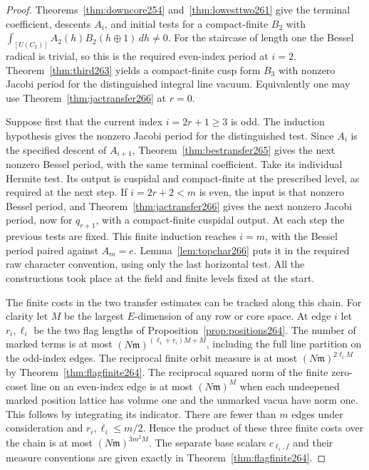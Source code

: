\documentclass[a4paper,11pt]{article}
\theoremstyle{definition}
\theoremstyle{remark}
\numberwithin{equation}{section}
\begin{document}
\begin{proof}
Theorems~\ref{thm:downcore254} and~\ref{thm:lowesttwo261}
give the terminal coefficient, descents \(A_i\), and initial
tests for a compact-finite \(B_2\) with
\(\int_{[U(C_2)]} A_2(h) B_2(h\oplus1)\,dh\ne0\).
For the staircase of length one the Bessel radical is
trivial, so this is the required even-index period at \(i=2\).
Theorem~\ref{thm:third263} yields a compact-finite cusp form
\(B_3\) with nonzero Jacobi period for the distinguished
integral line vacuum. Equivalently one may use
Theorem~\ref{thm:jactransfer266} at \(r=0\).

Suppose first that the current index \(i=2r+1\ge3\) is odd.
The induction hypothesis gives the nonzero Jacobi period for
the distinguished test. Since \(A_i\) is the specified
descent of \(A_{i+1}\), Theorem~\ref{thm:bestransfer265}
gives the next nonzero Bessel period, with the same terminal
coefficient. Take its individual Hermite test. Its output is
cuspidal and compact-finite at the prescribed level, as
required at the next step. If \(i=2r+2<m\) is even, the
input is that nonzero Bessel period, and
Theorem~\ref{thm:jactransfer266} gives the next nonzero Jacobi
period, now for \(q_{r+1}\), with a compact-finite cuspidal
output. At each step the previous tests are fixed. This
finite induction reaches \(i=m\), with the Bessel period
paired against \(A_m=e\). Lemma~\ref{lem:topchar266} puts it
in the required raw character convention, using only the
last horizontal test. All the constructions took place at
the field and finite levels fixed at the start.

The finite costs in the two transfer estimates can be tracked
along this chain. For clarity let \(M\) be the largest
\(E\)-dimension of any row or core space. At edge \(i\)
let \(r_i,\ell_i\) be the two flag lengths of
Proposition~\ref{prop:positions264}. The number of marked
terms is at most
\((N\mathfrak m)^{(\ell_i+r_i)M+M}\), including the full
line partition on the odd-index edges. The reciprocal
finite orbit measure is at most
\((N\mathfrak m)^{2\ell_iM}\) by
Theorem~\ref{thm:flagfinite264}. The reciprocal squared norm
of the finite zero-coset line on an even-index edge is at
most \((N\mathfrak m)^M\) when each undeepened marked
position lattice has volume one and the unmarked vacua
have norm one. This follows by integrating its indicator.
There are fewer than \(m\) edges under consideration and
\(r_i,\ell_i\le m/2\). Hence the product of these three
finite costs over the chain is at most
\((N\mathfrak m)^{3m^2M}\). The separate base scalars
\(c_{\ell_i,f}\) and their measure conventions are given
exactly in Theorem~\ref{thm:flagfinite264}.
\end{proof}
\end{document}
